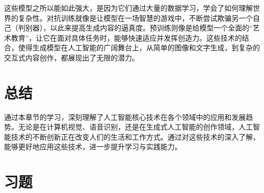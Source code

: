 这些模型之所以能如此强大，是因为它们通过大量的数据学习，学会了如何理解世界的复杂性。对抗训练就像是让模型在一场智慧的游戏中，不断尝试欺骗另一个自己（判别器），以此来提高生成内容的逼真度。预训练则像是给模型一个全面的“艺术教育”，让它在面对具体任务时，能够快速适应并发挥创造力。这些技术的结合，使得生成模型在人工智能的广阔舞台上，从简单的图像和文字生成，到复杂的交互式内容创作，都展现出了无限的潜力。

 


\section{总结}

通过本章节的学习，深刻理解了人工智能核心技术在各个领域中的应用和发展趋势。无论是在计算机视觉、语音识别，还是在生成式人工智能的创作领域，人工智能技术的不断创新正在改变人们的生活和工作方式。通过对这些技术的深入了解，能够更好地应用这些技术，进一步提升学习与实践能力。

\section* {习题}

